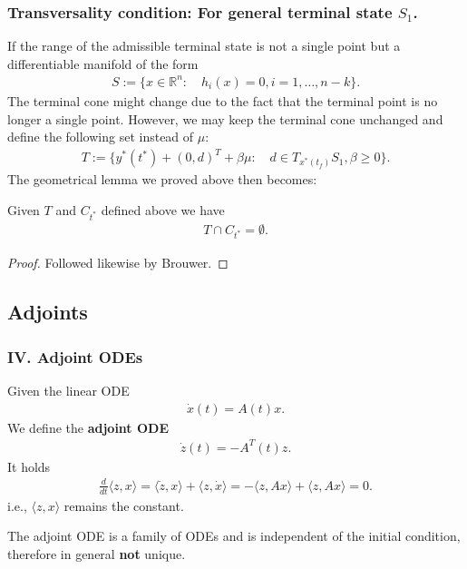 \subsubsection{Transversality condition: For general terminal state $S_1$.}
If the range of the admissible terminal state is not a single point but a differentiable manifold of the form
\begin{align*}
	S:= \{x \in \mathbb{R}^n: \quad h_i(x) = 0, i = 1, \dots, n -k \}. 
\end{align*}
The terminal cone might change due to the fact that the terminal point is no longer a single point. However, we may keep the terminal cone unchanged and define the following set instead of $\mu$: 
\begin{align*}
	T:= \{ y^*(t^*) +  (0, d)^T + \beta \mu: \quad d \in T_{x^*(t_f)}S_1, \beta \ge 0 \}. 
\end{align*}
The geometrical lemma we proved above then becomes:
\begin{lemma}
Given $T$ and $C_{t^*}$ defined above we have
\begin{align*}
	T \cap C_{t^*} = \emptyset. 
\end{align*}
\end{lemma}
\begin{proof}
	Followed likewise by Brouwer. 
\end{proof}




\subsection{Adjoints}
\subsubsection{IV. Adjoint ODEs}
\begin{definition}
Given the linear ODE
\begin{align*}
	\dot{x}(t) = A(t) x. 
\end{align*}	
We define the \textbf{adjoint ODE}
\begin{align*}
	\dot{z}(t)= - A^T(t) z.
\end{align*}
It holds
\begin{align*}
	\frac{d}{dt} \langle z, x\rangle = \langle \dot{z}, x\rangle + \langle z, \dot{x} \rangle = -\langle  z, A x \rangle + \langle z, Ax \rangle = 0.
\end{align*}
i.e., $\langle z, x \rangle $ remains the constant. 
\end{definition}
\begin{remark}
The adjoint ODE is a family of ODEs and is independent of the initial condition, therefore in general \textbf{not} unique. 
\end{remark}

